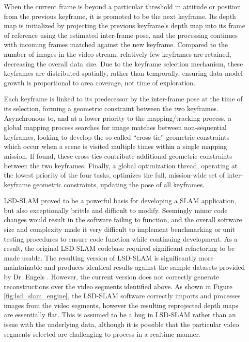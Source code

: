 \documentclass[letterpaper,12pt]{article}
\begin{document}
When the current frame is beyond a particular threshold in attitude or position from the previous keyframe, it is promoted to be the next keyframe.  Its depth map is initialized by projecting the previous keyframe's depth map into its frame of reference using the estimated inter-frame pose, and the processing continues with incoming frames matched against the new keyframe.  Compared to the number of images in the video stream, relatively few keyframes are retained, decreasing the overall data size.   Due to the keyframe selection mechanism, these keyframes are  distributed spatially, rather than temporally, ensuring data model growth is proportional to area coverage, not time of exploration. 

Each keyframe is linked to its predecessor by the inter-frame pose at the time of its selection, forming a geometric constraint between the two keyframes.   Asynchronous to, and at a lower priority to the mapping/tracking process, a global mapping process searches for image matches between non-sequential keyframes, looking to develop the so-called ``cross-tie'' geometric constraints which occur when a scene is visited multiple times within a single mapping mission.   If found, these cross-ties contribute additional geometric constraints between the two keyframes.     Finally, a global optimization thread, operating at the lowest priority of the four tasks, optimizes the full, mission-wide set of inter-keyframe geometric constraints, updating the pose of all keyframes.   

LSD-SLAM proved to be a powerful basis for developing a SLAM application, but also exceptionally brittle and difficult to modify.  Seemingly minor code changes would result in the software failing to function, and the overall software size and complexity made it very difficult to implement benchmarking or unit testing procedures to ensure code function while continuing development.   As a result, the original LSD-SLAM codebase required significant refactoring to be made usable.  The resulting version of LSD-SLAM is significantly more maintainable and produces identical results against the sample datasets provided by Dr. Engels \cite{lsdslam}.   However, the current version does not correctly generate reconstructions over the video segments identified above.  As shown in Figure \ref{fig:lsd_slam_engine}, the LSD-SLAM software correctly imports and processes images from the video segments, however the resulting reprojected depth maps are essentially flat.   This is assumed to be a bug in LSD-SLAM rather than an issue with the underlying data, although it is possible that the particular video segments selected are challenging to process in a realtime manner.
\end{document}
